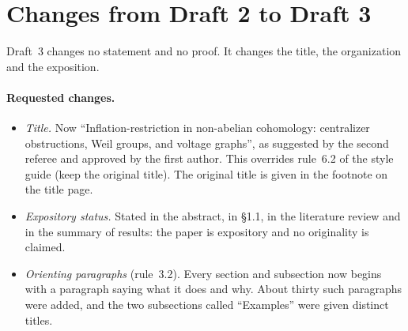 \documentclass[12pt,letterpaper]{article}
\begin{document}
\section{Changes from Draft 2 to Draft 3}\label{sec:d2d3}

Draft~3 changes no statement and no proof. It changes the title, the
organization and the exposition.

\paragraph{Requested changes.}
\begin{itemize}[itemsep=1pt]
\item \emph{Title.} Now ``Inflation-restriction in non-abelian
  cohomology: centralizer obstructions, Weil groups, and voltage graphs'',
  as suggested by the second referee and approved by the first author.
  This overrides rule~6.2 of the style guide (keep the original title).
  The original title is given in the footnote on the title page.
\item \emph{Expository status.} Stated in the abstract, in \S1.1, in the
  literature review and in the summary of results: the paper is
  expository and no originality is claimed.
\item \emph{Orienting paragraphs} (rule~3.2). Every section and
  subsection now begins with a paragraph saying what it does and why.
  About thirty such paragraphs were added, and the two subsections
  called ``Examples'' were given distinct titles.
\end{itemize}
\end{document}
